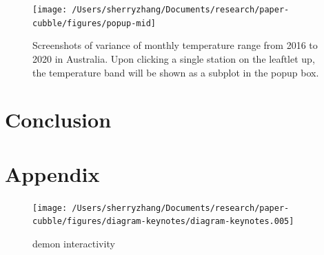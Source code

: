 \documentclass[
]{jss}
\begin{document}
\begin{CodeChunk}
\begin{figure}

{\centering \texttt{[image: /Users/sherryzhang/Documents/research/paper-cubble/figures/popup-mid]} 

}

\caption[Screenshots of variance of monthly temperature range from 2016 to 2020 in Australia]{Screenshots of variance of monthly temperature range from 2016 to 2020 in Australia. Upon clicking a single station on the leaftlet up, the temperature band will be shown as a subplot in the popup box.}\label{fig:interactive-popup}
\end{figure}
\end{CodeChunk}

\hypertarget{conclusion}{%
\section{Conclusion}\label{conclusion}}

\hypertarget{appendix}{%
\section{Appendix}\label{appendix}}

\begin{CodeChunk}
\begin{figure}

{\centering \texttt{[image: /Users/sherryzhang/Documents/research/paper-cubble/figures/diagram-keynotes/diagram-keynotes.005]} 

}

\caption[demon interactivity]{demon interactivity}\label{fig:illu-interactive-2}
\end{figure}
\end{CodeChunk}


\end{document}
